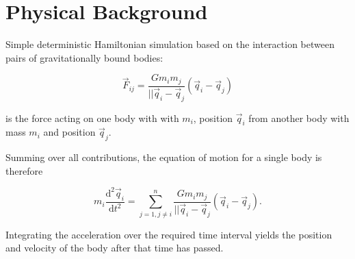 \documentclass{article}
\begin{document}
    \section{Physical Background}

    Simple deterministic Hamiltonian simulation based on the interaction between pairs of gravitationally bound bodies:

    \begin{equation}\label{eq:Fij}
        \vec{F}_{ij} = \frac{G m_i m_j}{|| \vec{q}_i - \vec{q}_j} (\vec{q}_i - \vec{q}_j)
    \end{equation}

    is the force acting on one body with with $m_i$, position $\vec{q}_i$ from another body with mass $m_i$ and position
    $\vec{q}_j$.

    Summing over all contributions, the equation of motion for a single body is therefore

    \begin{equation}\label{eq:EoMofbodyi}
        m_i \frac{\mathrm{d}^2 \vec{q}_i}{\mathrm{d} t^2} =
        \sum^n_{j=1, j\neq i} \frac{G m_i m_j}{|| \vec{q}_i - \vec{q}_j} (\vec{q}_i - \vec{q}_j).
    \end{equation}

    Integrating the acceleration over the required time interval yields the position and velocity of the body after
    that time has passed.
\end{document}
